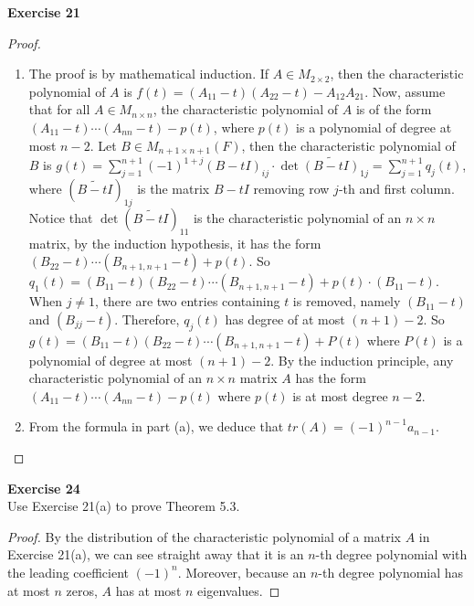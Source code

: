 \documentclass[12pt, a4paper]{article}
\theoremstyle{plain}
\newenvironment{exercise}[2][Exercise]
    { \begin{mdframed}[backgroundcolor=gray!20] \textbf{#1 #2} \\}
    {  \end{mdframed}}
\begin{document}
\pagebreak

\begin{exercise}{21}

\end{exercise}
	\begin{proof}
	\hfill
	\begin{enumerate}[label=(\alph*)]
	\item The proof is by mathematical induction. If $A\in M_{2\times 2}$, then the characteristic polynomial of $A$ is $f(t)=(A_{11}-t)(A_{22}-t)-A_{12}A_{21}$. Now, assume that for all $A\in M_{n\times n}$, the characteristic polynomial of $A$ is of the form $(A_{11}-t)\cdots(A_{nn}-t)-p(t)$, where $p(t)$ is a polynomial of degree at most $n-2$. Let $B\in M_{n+1\times n+1}(F)$, then the characteristic polynomial of $B$ is $g(t)=\sum_{j=1}^{n+1}{(-1)^{1+j}(B-tI)_{ij}\cdot \det\tilde{(B-tI)}_{1j}}=\sum_{j=1}^{n+1}{q_j(t)}$, where $(\tilde{B-tI})_{1j}$ is the matrix $B-tI$ removing row $j$-th and first column. Notice that $\det(\tilde{B-tI})_{11}$ is the characteristic polynomial of an $n\times n$ matrix, by the induction hypothesis, it has the form $(B_{22}-t)\cdots(B_{n+1,n+1}-t)+p(t)$. So $q_1(t) = (B_{11}-t)(B_{22}-t)\cdots(B_{n+1,n+1}-t)+p(t)\cdot (B_{11}-t)$. When $j\neq 1$, there are two entries containing $t$ is removed, namely $(B_{11}-t)$ and $(B_{jj}-t)$. Therefore, $q_j(t)$ has degree of at most $(n+1)-2$. So $g(t)=(B_{11}-t)(B_{22}-t)\cdots(B_{n+1,n+1}-t)+P(t)$ where $P(t)$ is a polynomial of degree at most $(n+1)-2$. By the induction principle, any characteristic polynomial of an $n\times n$ matrix $A$ has the form $(A_{11}-t)\cdots(A_{nn}-t)-p(t)$ where $p(t)$ is at most degree $n-2$.
	
	\item From the formula in part (a), we deduce that $tr(A)=(-1)^{n-1}a_{n-1}$.
	\end{enumerate}
	\end{proof}
	
\begin{exercise}{24}
Use Exercise 21(a) to prove Theorem 5.3.
\end{exercise}
	\begin{proof}
	By the distribution of the characteristic polynomial of a matrix $A$ in Exercise 21(a), we can see straight away that it is an $n$-th degree polynomial with the leading coefficient $(-1)^n$. Moreover, because an $n$-th degree polynomial has at most $n$ zeros, $A$ has at most $n$ eigenvalues.
	\end{proof}
\end{document}
